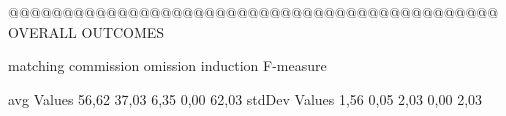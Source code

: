 @@@@@@@@@@@@@@@@@@@@@@@@@@@@@@@@@@@@@@@@@@@@@ OVERALL OUTCOMES

                matching commission   omission  induction    F-measure   

avg Values      56,62      37,03       6,35      0,00        62,03      
stdDev Values   1,56       0,05       2,03      0,00         2,03




